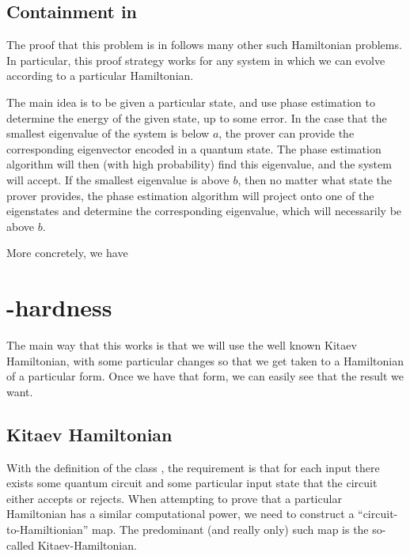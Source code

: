 \documentclass[../thesis-main/thesis-main]{subfiles}
\begin{document}
\subsection{Containment in \QMA}

The proof that this problem is in \QMA follows many other such Hamiltonian problems.  In particular, this proof strategy works for any system in which we can evolve according to a particular Hamiltonian.

The main idea is to be given a particular state, and use phase estimation to determine the energy of the given state, up to some error.  In the case that the smallest eigenvalue of the system is below $a$, the prover can provide the corresponding eigenvector encoded in a quantum state.  The phase estimation algorithm will then (with high probability) find this eigenvalue, and the system will accept.  If the smallest eigenvalue is above $b$, then no matter what state the prover provides, the phase estimation algorithm will project onto one of the eigenstates and determine the corresponding eigenvalue, which will necessarily be above $b$.

More concretely, we have 



\section{\QMA-hardness}

The main way that this works is that we will use the well known Kitaev Hamiltonian, with some particular changes so that we get taken to a Hamiltonian of a particular form.  Once we have that form, we can easily see that the result we want.

\subsection{Kitaev Hamiltonian}\label{sec:Kitaev_Hamiltonian}

With the definition of the class \QMA, the requirement is that for each input there exists some quantum circuit and some particular input state that the circuit either accepts or rejects.  When attempting to prove that a particular Hamiltonian has a similar computational power, we need to construct a ``circuit-to-Hamiltionian'' map.  The predominant (and really only) such map is the so-called Kitaev-Hamiltonian.
\end{document}
